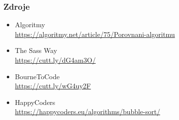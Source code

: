 \documentclass{beamer}
\begin{document}
\begin{frame}\frametitle{Zdroje}
    \begin{itemize}
    \transglitter
        \item Algoritmy \\ \url{https://algoritmy.net/article/75/Porovnani-algoritmu}
        \item The Sass Way \\ 
        \url{https://cutt.ly/dG4am3O/}
        \item BourneToCode \\ 
        \url{https://cutt.ly/wG4uy2F}
        \item HappyCoders \\ \url{https://happycoders.eu/algorithms/bubble-sort/}
    \end{itemize}
\end{frame}
\end{document}
